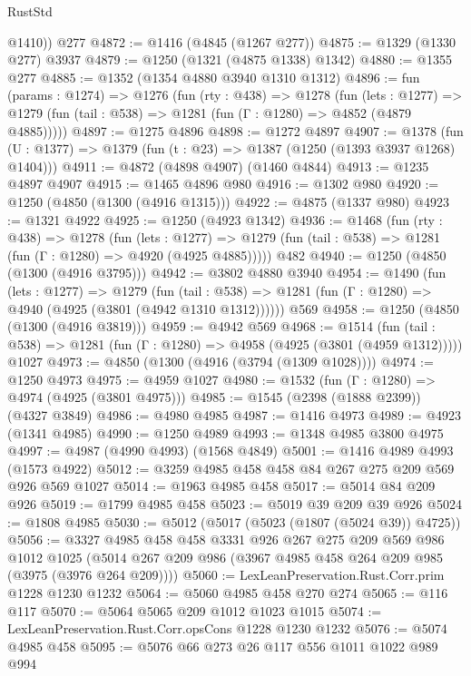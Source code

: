 \begin{lexlean}{RustStd}
\begin{coremodule}
        @1410))
    @277
@4872 := @1416 (@4845 (@1267 @277))
@4875 := @1329 (@1330 @277) @3937
@4879 := @1250 (@1321 (@4875 @1338) @1342)
@4880 := @1355 @277
@4885 := @1352 (@1354 @4880 @3940 @1310 @1312)
@4896 := fun (params : @1274) =>
  @1276
    (fun (rty : @438) =>
    @1278
      (fun (lets : @1277) =>
      @1279 (fun (tail : @538) => @1281 (fun (Γ : @1280) => @4852 (@4879 @4885)))))
@4897 := @1275 @4896
@4898 := @1272 @4897
@4907 := @1378 (fun (U : @1377) => @1379 (fun (t : @23) => @1387 (@1250 (@1393 @3937 @1268) @1404)))
@4911 := @4872 (@4898 @4907) (@1460 @4844)
@4913 := @1235 @4897 @4907
@4915 := @1465 @4896 @980
@4916 := @1302 @980
@4920 := @1250 (@4850 (@1300 (@4916 @1315)))
@4922 := @4875 (@1337 @980)
@4923 := @1321 @4922
@4925 := @1250 (@4923 @1342)
@4936 := @1468
    (fun (rty : @438) =>
    @1278
      (fun (lets : @1277) =>
      @1279 (fun (tail : @538) => @1281 (fun (Γ : @1280) => @4920 (@4925 @4885)))))
    @482
@4940 := @1250 (@4850 (@1300 (@4916 @3795)))
@4942 := @3802 @4880 @3940
@4954 := @1490
    (fun (lets : @1277) =>
    @1279
      (fun (tail : @538) => @1281 (fun (Γ : @1280) => @4940 (@4925 (@3801 (@4942 @1310 @1312))))))
    @569
@4958 := @1250 (@4850 (@1300 (@4916 @3819)))
@4959 := @4942 @569
@4968 := @1514
    (fun (tail : @538) => @1281 (fun (Γ : @1280) => @4958 (@4925 (@3801 (@4959 @1312)))))
    @1027
@4973 := @4850 (@1300 (@4916 (@3794 (@1309 @1028))))
@4974 := @1250 @4973
@4975 := @4959 @1027
@4980 := @1532 (fun (Γ : @1280) => @4974 (@4925 (@3801 @4975)))
@4985 := @1545 (@2398 (@1888 @2399)) (@4327 @3849)
@4986 := @4980 @4985
@4987 := @1416 @4973
@4989 := @4923 (@1341 @4985)
@4990 := @1250 @4989
@4993 := @1348 @4985 @3800 @4975
@4997 := @4987 (@4990 @4993) (@1568 @4849)
@5001 := @1416 @4989 @4993 (@1573 @4922)
@5012 := @3259 @4985 @458 @458 @84 @267 @275 @209 @569 @926 @569 @1027
@5014 := @1963 @4985 @458
@5017 := @5014 @84 @209 @926
@5019 := @1799 @4985 @458
@5023 := @5019 @39 @209 @39 @926
@5024 := @1808 @4985
@5030 := @5012 (@5017 (@5023 (@1807 (@5024 @39)) @4725))
@5056 := @3327
    @4985
    @458
    @458
    @3331
    @926
    @267
    @275
    @209
    @569
    @986
    @1012
    @1025
    (@5014 @267 @209 @986 (@3967 @4985 @458 @264 @209 @985 (@3975 (@3976 @264 @209))))
@5060 := LexLeanPreservation.Rust.Corr.prim @1228 @1230 @1232
@5064 := @5060 @4985 @458 @270 @274
@5065 := @116 @117
@5070 := @5064 @5065 @209 @1012 @1023 @1015
@5074 := LexLeanPreservation.Rust.Corr.opsCons @1228 @1230 @1232
@5076 := @5074 @4985 @458
@5095 := @5076
    @66
    @273
    @26
    @117
    @556
    @1011
    @1022
    @989
    @994

\end{coremodule}
\end{lexlean}
